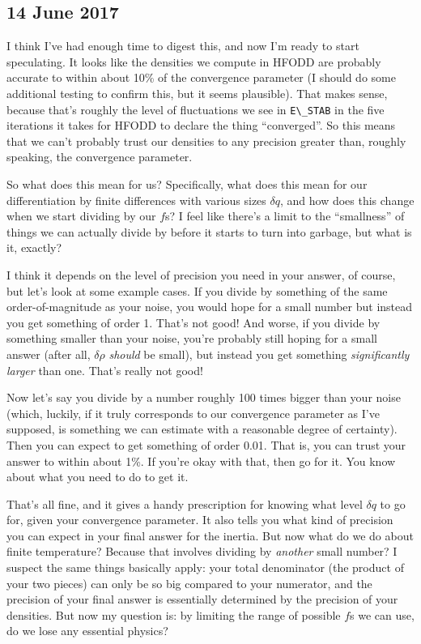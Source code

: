 \documentclass[]{report}
\begin{document}
\subsection*{14 June 2017}
I think I've had enough time to digest this, and now I'm ready to start speculating. It looks like the densities we compute in HFODD are probably accurate to within about 10\% of the convergence parameter (I should do some additional testing to confirm this, but it seems plausible). That makes sense, because that's roughly the level of fluctuations we see in \verb|E\_STAB| in the five iterations it takes for HFODD to declare the thing ``converged''. So this means that we can't probably trust our densities to any precision greater than, roughly speaking, the convergence parameter.

So what does this mean for us? Specifically, what does this mean for our differentiation by finite differences with various sizes $\delta q$, and how does this change when we start dividing by our $f$s? I feel like there's a limit to the ``smallness'' of things we can actually divide by before it starts to turn into garbage, but what is it, exactly?

I think it depends on the level of precision you need in your answer, of course, but let's look at some example cases. If you divide by something of the same order-of-magnitude as your noise, you would hope for a small number but instead you get something of order 1. That's not good! And worse, if you divide by something smaller than your noise, you're probably still hoping for a small answer (after all, $\delta \rho$ \textit{should} be small), but instead you get something \textit{significantly larger} than one. That's really not good!

Now let's say you divide by a number roughly 100 times bigger than your noise (which, luckily, if it truly corresponds to our convergence parameter as I've supposed, is something we can estimate with a reasonable degree of certainty). Then you can expect to get something of order 0.01. That is, you can trust your answer to within about 1\%. If you're okay with that, then go for it. You know about what you need to do to get it.

That's all fine, and it gives a handy prescription for knowing what level $\delta q$ to go for, given your convergence parameter. It also tells you what kind of precision you can expect in your final answer for the inertia. But now what do we do about finite temperature? Because that involves dividing by \textit{another} small number? I suspect the same things basically apply: your total denominator (the product of your two pieces) can only be so big compared to your numerator, and the precision of your final answer is essentially determined by the precision of your densities. But now my question is: by limiting the range of possible $f$s we can use, do we lose any essential physics?
\end{document}
